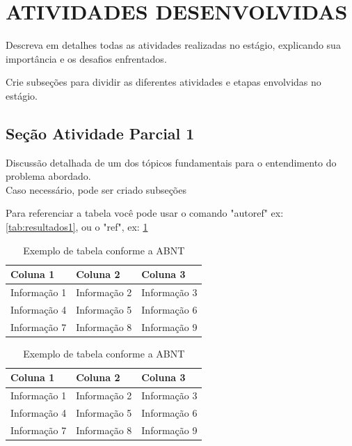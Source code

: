 \section{ATIVIDADES DESENVOLVIDAS} \label{ch:atividades-desenvolvidas}
Descreva em detalhes todas as atividades realizadas no estágio, explicando sua importância e os desafios enfrentados.

Crie subseções para dividir as diferentes atividades e etapas  envolvidas no estágio.

\subsection{ Seção Atividade Parcial 1} \label{sec:definir-tituto-da-secao1}

Discussão detalhada de um dos tópicos fundamentais para o entendimento do problema abordado. \\ Caso necessário, pode ser criado subseções

Para referenciar a tabela você pode usar o comando "autoref" ex: \autoref{tab:resultados1}, ou o "ref", ex: \ref{tab:resultados1}

\begin{table}[htb]
\centering
\caption{Exemplo de tabela conforme a ABNT}
\label{tab:resultados1}
\begin{tabular}{p{} p{} p{}} %
    \hline
    \textbf{Coluna 1} & \textbf{Coluna 2} & \textbf{Coluna 3} \\
    \hline
    Informação 1 & Informação 2 & Informação 3 \\
    Informação 4 & Informação 5 & Informação 6 \\
    Informação 7 & Informação 8 & Informação 9 \\  
    \hline
\end{tabular}
\end{table}

\begin{table}[htb]
\centering
\caption{Exemplo de tabela conforme a ABNT}
\label{tab:resultados2}
\begin{tabular}{>{\centering\arraybackslash}p{}  >{\centering\arraybackslash}p{}  >{\centering\arraybackslash}p{}} %
    \hline
    \textbf{Coluna 1} & \textbf{Coluna 2} & \textbf{Coluna 3} \\
    \hline
    Informação 1 & Informação 2 & Informação 3 \\
    Informação 4 & Informação 5 & Informação 6 \\
    Informação 7 & Informação 8 & Informação 9 \\  
    \hline
\end{tabular}
\end{table}


